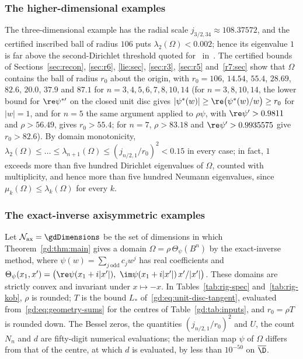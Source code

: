 \subsubsection{The higher-dimensional examples}
The three-dimensional example has the radial scale $j_{3/2,34}\approx108.37572$, and the certified inscribed ball of radius $106$ puts $\lambda_2(\Omega)<0.002$; hence its eigenvalue $1$ is far above the second-Dirichlet threshold quoted for~\cite{DLS26} in~\cite[\S1]{DSWZ25}. The certified bounds of Sections~\ref{sec:recon}, \ref{sec:r6}, \ref{lie:sec}, \ref{sec:r3}, \ref{sec:r5} and~\ref{r7:sec} show that $\Omega$ contains the ball of radius $r_0$ about the origin, with $r_0=106$, $14.54$, $55.4$, $28.69$, $82.6$, $20.0$, $37.9$ and $87.1$ for $n=3,4,5,6,7,8,10,14$ (for $n=3,8,10,14$, the lower bound for $\re\psi^{*\prime}$ on the closed unit disc gives $|\psi^*(w)|\geq\re\big(\psi^*(w)/w\big)\geq r_0$ for $|w|=1$, and for $n=5$ the same argument applied to $\rho\psi$, with $\re\psi'>0.9811$ and $\rho>56.49$, gives $r_0>55.4$; for $n=7$, $\rho>83.18$ and $\re\psi'>0.9935575$ give $r_0>82.6$). By domain monotonicity, $\lambda_2(\Omega)\leq\ldots\leq\lambda_{n+1}(\Omega)\leq(j_{n/2,1}/r_0)^2<0.15$ in every case; in fact, $1$ exceeds more than five hundred Dirichlet eigenvalues of $\Omega$, counted with multiplicity, and hence more than five hundred Neumann eigenvalues, since $\mu_k(\Omega)\leq\lambda_k(\Omega)$ for every $k$.

\subsubsection{The exact-inverse axisymmetric examples}\label{sec:rig-ax}
\newcommand{\gdRigDimensions}{\gdDimensions}
Let $\mathcal N_{\mathrm{ax}}=\gdDimensions$ be the set of dimensions in which Theorem~\ref{gd:thm:main} gives a domain $\Omega=\rho\,\Theta_\psi(B^n)$ by the exact-inverse method, where $\psi(w)=\sum_{j\ \mathrm{odd}}c_jw^j$ has real coefficients and $\Theta_\psi(x_1,x')=\bigl(\re\psi(x_1+i|x'|),\ \im\psi(x_1+i|x'|)\,x'/|x'|\bigr)$. These domains are strictly convex and invariant under $x\mapsto-x$. In Tables~\ref{tab:rig-spec} and~\ref{tab:rig-kob}, $\rho$ is rounded; $T$ is the bound $L_*$ of~\eqref{gd:eq:unit-disc-tangent}, evaluated from~\eqref{gd:eq:geometry-sums} for the centres of Table~\ref{gd:tab:inputs}, and $r_0=\rho T$ is rounded down. The Bessel zeros, the quantities $(j_{n/2,1}/r_0)^2$ and $U$, the count $N_n$ and $d$ are fifty-digit numerical evaluations; the meridian map $\psi$ of $\Omega$ differs from that of the centre, at which $d$ is evaluated, by less than $10^{-50}$ on $\overline\D$.

